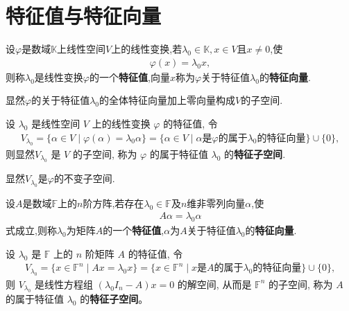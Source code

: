 \documentclass[../../main.tex]{subfiles}%
\begin{document}
\section{特征值与特征向量}

\begin{definition}[线性变换的特征值和特征向量]
设$\varphi$是数域$\mathbb{K}$上线性空间$V$上的线性变换,若$\lambda_0 \in \mathbb{K}, x \in V$且$x \neq 0$,使
\begin{align*}
\varphi(x) = \lambda_0 x,
\end{align*}
则称$\lambda_0$是线性变换$\varphi$的一个\textbf{特征值},向量$x$称为$\varphi$关于特征值$\lambda_0$的\textbf{特征向量}.
\end{definition}
\begin{note}
显然$\varphi$的关于特征值$\lambda_0$的全体特征向量加上零向量构成$V$的子空间.
\end{note}

\begin{definition}[线性变换的特征子空间]
设 $\lambda_0$ 是线性空间 $V$ 上的线性变换 $\varphi$ 的特征值, 令
\begin{align*}
V_{\lambda_0} = \{\alpha \in V \mid \varphi(\alpha) = \lambda_0 \alpha\} 
= \{\alpha \in V \mid \alpha \text{是} \varphi \text{的属于} \lambda_0 \text{的特征向量}\} \cup \{0\},
\end{align*}
则显然$V_{\lambda_0}$ 是 $V$ 的子空间, 称为 $\varphi$ 的属于特征值 $\lambda_0$ 的\textbf{特征子空间}.
\end{definition}
\begin{note}
显然$V_{\lambda_0}$是$\varphi$的不变子空间.
\end{note}

\begin{definition}[矩阵的特征值和特征向量]
设$A$是数域$\mathbb{F}$上的$n$阶方阵,若存在$\lambda_0 \in \mathbb{F}$及$n$维非零列向量$\alpha$,使
\begin{align*}
A \alpha = \lambda_0 \alpha
\end{align*}
式成立,则称$\lambda_0$为矩阵$A$的一个\textbf{特征值},$\alpha$为$A$关于特征值$\lambda_0$的\textbf{特征向量}.
\end{definition}

\begin{definition}[矩阵的特征子空间]
设 $\lambda_0$ 是 $\mathbb{F}$ 上的 $n$ 阶矩阵 $A$ 的特征值, 令
\begin{align*}
V_{\lambda_0} = \{x \in \mathbb{F}^n \mid Ax = \lambda_0 x\} 
= \{x \in \mathbb{F}^n \mid x \text{是} A \text{的属于} \lambda_0 \text{的特征向量}\} \cup \{0\},
\end{align*}
则 $V_{\lambda_0}$ 是线性方程组 $(\lambda_0 I_n - A)x = 0$ 的解空间, 从而是 $\mathbb{F}^n$ 的子空间, 称为 $A$ 的属于特征值 $\lambda_0$ 的\textbf{特征子空间}。
\end{definition}
\end{document}
